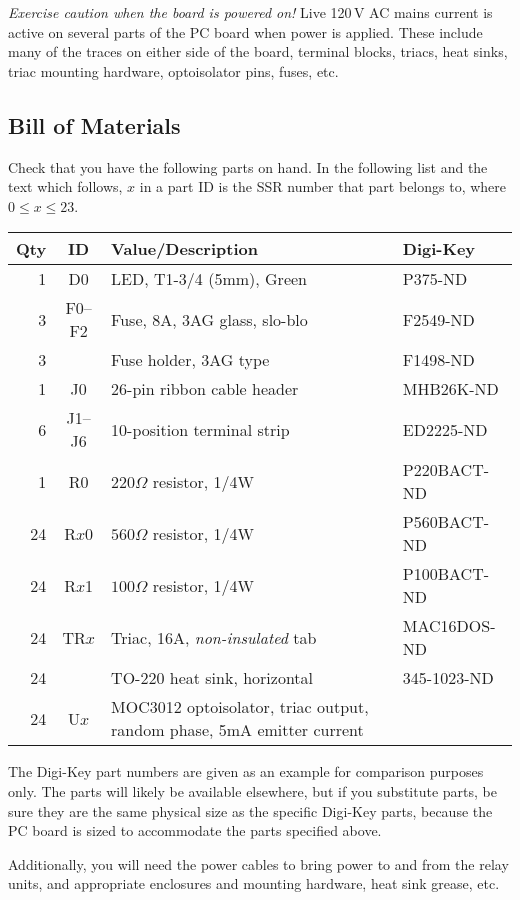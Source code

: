 \documentclass[12pt]{article}
\begin{document}
\emph{Exercise caution when the board is powered on!}  Live 120\,V AC mains 
current is active on several parts of the PC board when power is
applied.  These include many of the traces on either side of the
board, terminal blocks, triacs, heat sinks, triac mounting hardware,
optoisolator pins, fuses, etc.

\subsection{Bill of Materials}
Check that you have the following parts on hand.  In the following list
and the text which follows, $x$ in a part ID is the SSR number that
part belongs to, where $0 \le x \le 23$.
 \begin{longtable}[c]{|r|c|p{2.25in}|l|}\hline
  \bf Qty & \bf ID & \bf Value/Description & \bf Digi-Key\\\hline\hline
  \endhead
   1 & D0     & LED, T1-3/4 (5mm), Green   & P375-ND  \\\hline
   3 & F0--F2 & Fuse, 8A, 3AG glass, slo-blo& F2549-ND \\\hline
   3 &        & Fuse holder, 3AG type      & F1498-ND \\\hline
   1 & J0     & 26-pin ribbon cable header & MHB26K-ND\\\hline
   6 & J1--J6 & 10-position terminal strip & ED2225-ND\\\hline
   1 & R0     & $220\Omega$ resistor, 1/4W & P220BACT-ND\\\hline
  24 & R$x$0  & $560\Omega$ resistor, 1/4W & P560BACT-ND\\\hline
  24 & R$x$1  & $100\Omega$ resistor, 1/4W & P100BACT-ND  \\\hline
  24 & TR$x$  & Triac, 16A, {\em non-insulated\/} tab & MAC16DOS-ND\\\hline
  24 &        & TO-220 heat sink, horizontal & 345-1023-ND\\\hline
  24 & U$x$   & MOC3012 optoisolator, triac output, random phase, 5mA
  emitter current &\\\hline
 \end{longtable}

The Digi-Key part numbers are given as an example for comparison 
purposes only.  The parts will likely be available elsewhere, but
if you substitute parts, be sure they are the same physical size
as the specific Digi-Key parts, because the PC board is sized to
accommodate the parts specified above.

Additionally, you will need the power cables to bring power to and from
the relay units, and appropriate enclosures and mounting hardware, heat
sink grease, etc.
\end{document}
